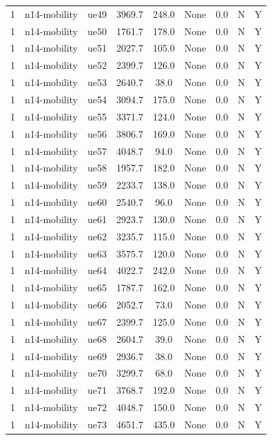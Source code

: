 \begin{table}[ht]
\begin{tabular}{|c|c|c|c|c|c|c|c|c|}
1 & n14-mobility & ue49 & 3969.7 & 248.0 & None & 0.0 & N & Y \\
1 & n14-mobility & ue50 & 1761.7 & 178.0 & None & 0.0 & N & Y \\
1 & n14-mobility & ue51 & 2027.7 & 105.0 & None & 0.0 & N & Y \\
1 & n14-mobility & ue52 & 2399.7 & 126.0 & None & 0.0 & N & Y \\
1 & n14-mobility & ue53 & 2640.7 & 38.0 & None & 0.0 & N & Y \\
1 & n14-mobility & ue54 & 3094.7 & 175.0 & None & 0.0 & N & Y \\
1 & n14-mobility & ue55 & 3371.7 & 124.0 & None & 0.0 & N & Y \\
1 & n14-mobility & ue56 & 3806.7 & 169.0 & None & 0.0 & N & Y \\
1 & n14-mobility & ue57 & 4048.7 & 94.0 & None & 0.0 & N & Y \\
1 & n14-mobility & ue58 & 1957.7 & 182.0 & None & 0.0 & N & Y \\
1 & n14-mobility & ue59 & 2233.7 & 138.0 & None & 0.0 & N & Y \\
1 & n14-mobility & ue60 & 2540.7 & 96.0 & None & 0.0 & N & Y \\
1 & n14-mobility & ue61 & 2923.7 & 130.0 & None & 0.0 & N & Y \\
1 & n14-mobility & ue62 & 3235.7 & 115.0 & None & 0.0 & N & Y \\
1 & n14-mobility & ue63 & 3575.7 & 120.0 & None & 0.0 & N & Y \\
1 & n14-mobility & ue64 & 4022.7 & 242.0 & None & 0.0 & N & Y \\
1 & n14-mobility & ue65 & 1787.7 & 162.0 & None & 0.0 & N & Y \\
1 & n14-mobility & ue66 & 2052.7 & 73.0 & None & 0.0 & N & Y \\
1 & n14-mobility & ue67 & 2399.7 & 125.0 & None & 0.0 & N & Y \\
1 & n14-mobility & ue68 & 2604.7 & 39.0 & None & 0.0 & N & Y \\
1 & n14-mobility & ue69 & 2936.7 & 38.0 & None & 0.0 & N & Y \\
1 & n14-mobility & ue70 & 3299.7 & 68.0 & None & 0.0 & N & Y \\
1 & n14-mobility & ue71 & 3768.7 & 192.0 & None & 0.0 & N & Y \\
1 & n14-mobility & ue72 & 4048.7 & 150.0 & None & 0.0 & N & Y \\
1 & n14-mobility & ue73 & 4651.7 & 435.0 & None & 0.0 & N & Y \\

\end{tabular}
\end{table}

